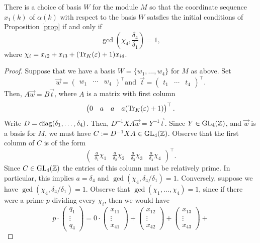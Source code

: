 \documentclass[11pt]{amsart}
\begin{document}
\begin{prop}\label{quarticprop} There is a choice of basis $W$ for the module $M$ so that the coordinate sequence $x_1(k)$ of $\alpha(k)$ with respect to the basis $W$ satsfies the initial conditions of Proposition \ref{prop} if and only if 
\[\gcd\left(\chi_4, \frac{\delta_4}{\delta_1}\right)=1,\]
where $\chi_i=x_{i2}+x_{i3}+(\operatorname{Tr}_K(\varepsilon)+1)x_{i4}$. 

\begin{proof} Suppose that we have a basis $W=\{w_1, \dots, w_4\}$ for $M$ as above. Set
\[\vec{w}=\begin{pmatrix} w_1 & \cdots & w_4 \end{pmatrix}^{\top} \text{and }\, \vec{t}= \begin{pmatrix} t_1 & \cdots & t_4 \end{pmatrix}^{\top}.\]
Then, $A \vec{w}=B\vec{t}$, where $A$ is a matrix with first column
\[\begin{pmatrix} 0 & a & a & a (\operatorname{Tr}_K(\varepsilon)+1) \end{pmatrix}^{\top}.\] 
Write $D=\operatorname{diag}(\delta_1, \dots, \delta_4)$. Then, $D^{-1}XA \vec{w}=Y^{-1}\vec{t}$. Since $Y \in \operatorname{GL}_4(\mathbb{Z})$, and $\vec{w}$ is a basis for $M$, we must have $C:=D^{-1}XA \in \operatorname{GL}_4(\mathbb{Z})$. Observe that the first column of $C$ is of the form
\[ \begin{pmatrix} \frac{a}{\delta_1} \chi_1 & \frac{a}{\delta_2} \chi_2 & \frac{a}{\delta_3} \chi_3 & \frac{a}{\delta_4} \chi_4 \end{pmatrix}^{\top}.\]
Since $C \in \operatorname{GL}_4(\mathbb{Z})$ the entries of this column must be relatively prime. In particular, this implies $a=\delta_4$ and $\gcd(\chi_4, \delta_4/\delta_1)=1$. Conversely, suppose we have $\gcd(\chi_4, \delta_4/\delta_1)=1$. Observe that $\gcd(\chi_1, \dots, \chi_4)=1$, since if there were a prime $p$ dividing every $\chi_i$, then we would have 
\[ p \cdot \begin{pmatrix} q_1 \\ \vdots \\ q_4 \end{pmatrix} = 0 \cdot \begin{pmatrix} x_{11} \\ \vdots \\ x_{41} \end{pmatrix}+
\begin{pmatrix} x_{12} \\ \vdots \\ x_{42} \end{pmatrix}+
 \begin{pmatrix} x_{13} \\ \vdots \\ x_{43} \end{pmatrix}+
\]
\end{proof}
\end{prop}
\end{document}
